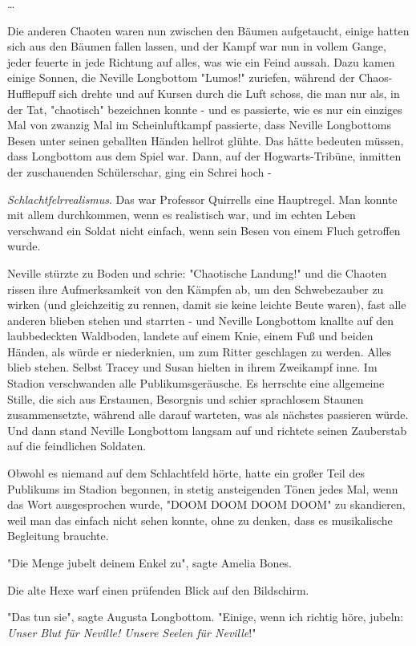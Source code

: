 {…

Die anderen Chaoten waren nun zwischen den Bäumen aufgetaucht, einige hatten sich aus den Bäumen fallen lassen, und der Kampf war nun in vollem Gange, jeder feuerte in jede Richtung auf alles, was wie ein Feind aussah. Dazu kamen einige Sonnen, die Neville Longbottom "Lumos!" zuriefen, während der Chaos-Hufflepuff sich drehte und auf Kursen durch die Luft schoss, die man nur als, in der Tat, "chaotisch" bezeichnen konnte - und es passierte, wie es nur ein einziges Mal von zwanzig Mal im Scheinluftkampf passierte, dass Neville Longbottoms Besen unter seinen geballten Händen hellrot glühte. Das hätte bedeuten müssen, dass Longbottom aus dem Spiel war. Dann, auf der Hogwarts-Tribüne, inmitten der zuschauenden Schülerschar, ging ein Schrei hoch -

\emph{Schlachtfelrrealismus}. Das war Professor Quirrells eine Hauptregel. Man konnte mit allem durchkommen, wenn es realistisch war, und im echten Leben verschwand ein Soldat nicht einfach, wenn sein Besen von einem Fluch getroffen wurde.

Neville stürzte zu Boden und schrie: "Chaotische Landung!" und die Chaoten rissen ihre Aufmerksamkeit von den Kämpfen ab, um den Schwebezauber zu wirken (und gleichzeitig zu rennen, damit sie keine leichte Beute waren), fast alle anderen blieben stehen und starrten - und Neville Longbottom knallte auf den laubbedeckten Waldboden, landete auf einem Knie, einem Fuß und beiden Händen, als würde er niederknien, um zum Ritter geschlagen zu werden. Alles blieb stehen. Selbst Tracey und Susan hielten in ihrem Zweikampf inne. Im Stadion verschwanden alle Publikumsgeräusche. Es herrschte eine allgemeine Stille, die sich aus Erstaunen, Besorgnis und schier sprachlosem Staunen zusammensetzte, während alle darauf warteten, was als nächstes passieren würde. Und dann stand Neville Longbottom langsam auf und richtete seinen Zauberstab auf die feindlichen Soldaten.

Obwohl es niemand auf dem Schlachtfeld hörte, hatte ein großer Teil des Publikums im Stadion begonnen, in stetig ansteigenden Tönen jedes Mal, wenn das Wort ausgesprochen wurde, "DOOM DOOM DOOM DOOM" zu skandieren, weil man das einfach nicht sehen konnte, ohne zu denken, dass es musikalische Begleitung brauchte.

"Die Menge jubelt deinem Enkel zu", sagte Amelia Bones.

Die alte Hexe warf einen prüfenden Blick auf den Bildschirm.

"Das tun sie", sagte Augusta Longbottom. "Einige, wenn ich richtig höre, jubeln: \emph{Unser Blut für Neville! Unsere Seelen für Neville}!"

}
